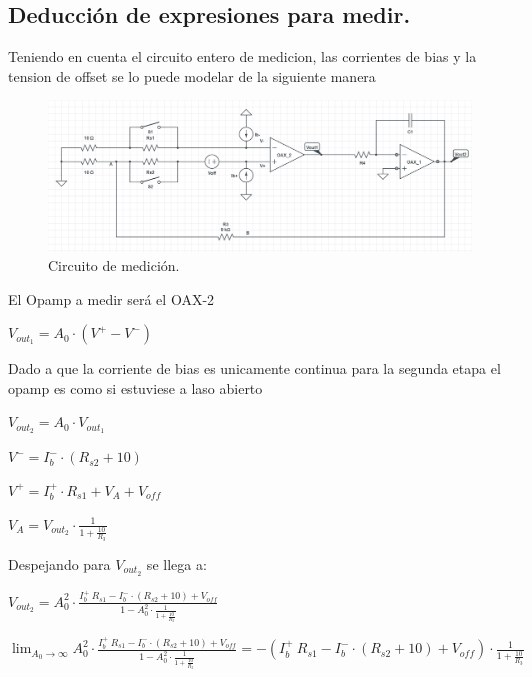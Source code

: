\documentclass[a4paper]{article}
\begin{document}
\subsection{Deducción de expresiones para medir.}

Teniendo en cuenta el circuito entero de medicion, las corrientes de bias y la tension de offset se lo puede modelar de la siguiente manera
\begin{figure}[H]	
	\centering
	\includegraphics[width=\textwidth]{imagenes/Medicion.PNG}
	\caption{Circuito de medición.}
	\label{fig:Medicion}
\end{figure}
El Opamp a medir será el OAX-2
\begin{center}$V_{out_1}=A_0 \cdot (V^+ - V^-)$\\\end{center}
Dado a que la corriente de bias es unicamente continua para la segunda etapa el opamp es como si estuviese a laso abierto\\
\begin{center}$V_{out_2}=A_0 \cdot V_{out_1}$\\\end{center}
\begin{center}$V^-=I_b^- \cdot (R_{s2}+10)$\\\end{center}
\begin{center}$V^+=I_b^+ \cdot R_{s1} +V_A+V_{off}$\\\end{center}
\begin{center}$V_A=V_{out_2} \cdot \frac{1}{1+\frac{10}{R_3}}$\\\end{center}
Despejando para $V_{out_2}$ se llega a:
\begin{center}$V_{out_2}=A_0^2  \cdot \frac{I_b^+ \ R_{s1} -I_b^-\cdot (R_{s2}+10)+V_{off}}{1-A_0^2 \cdot \frac{1}{1+\frac{10}{R_3}}}$\\\end{center}
$\lim_{A_0\to\infty} A_0^2  \cdot \frac{I_b^+ \ R_{s1} -I_b^-\cdot (R_{s2}+10)+V_{off}}{1-A_0^2 \cdot \frac{1}{1+\frac{10}{R_3}}}=-(I_b^+ \ R_{s1} -I_b^-\cdot (R_{s2}+10)+V_{off})\cdot \frac{1}{1+\frac{10}{R_3}} $
\end{document}
